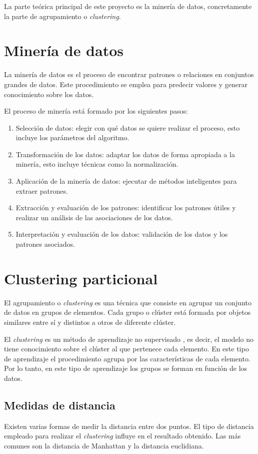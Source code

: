La parte teórica principal de este proyecto es la minería de datos, concretamente la parte de agrupamiento o \emph{clustering}.

\section{Minería de datos}
La minería de datos \cite{wiki:mineria} es el proceso de encontrar patrones o relaciones en conjuntos grandes de datos. Este procedimiento se emplea para predecir valores y generar conocimiento sobre los datos.

El proceso de minería está formado por los siguientes pasos:
\begin{enumerate}
	\item Selección de datos: elegir con qué datos se quiere realizar el proceso, esto incluye los parámetros del algoritmo.
	\item Transformación de los datos: adaptar los datos de forma apropiada a la minería, esto incluye técnicas como la normalización.
	\item Aplicación de la minería de datos: ejecutar de métodos inteligentes para extraer patrones.
	\item Extracción y evaluación de los patrones: identificar los patrones útiles y realizar un análisis de las asociaciones de los datos.
	\item Interpretación y evaluación de los datos: validación de los datos y los patrones asociados.
\end{enumerate}

\section{Clustering particional}
El agrupamiento o \emph{clustering} \cite{BibEntry2016Mar} es una técnica que consiste en agrupar un conjunto de datos en grupos de elementos. Cada grupo o clúster está formada por objetos similares entre sí y distintos a otros de diferente clúster.

El \emph{clustering} es un método de aprendizaje no supervisado \cite{wiki:aprendizaje}, es decir, el modelo no tiene conocimiento sobre el clúster al que pertenece cada elemento. En este tipo de aprendizaje el procedimiento agrupa por las características de cada elemento. Por lo tanto, en este tipo de aprendizaje los grupos se forman en función de los datos.

\subsection{Medidas de distancia}
Existen varias formas de medir la distancia entre dos puntos. El tipo de distancia empleado para realizar el \emph{clustering} influye en el resultado obtenido. Las más comunes son la distancia de Manhattan y la distancia euclidiana.

